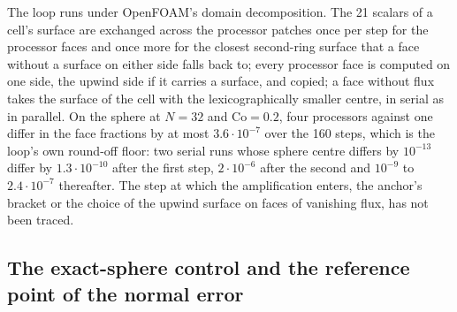 \documentclass[preprint,12pt]{elsarticle}
\begin{document}
The loop runs under OpenFOAM's domain decomposition. The 21 scalars of a cell's surface are exchanged across the processor patches once per step for the processor faces and once more for the closest second-ring surface that a face without a surface on either side falls back to; every processor face is computed on one side, the upwind side if it carries a surface, and copied; a face without flux takes the surface of the cell with the lexicographically smaller centre, in serial as in parallel. On the sphere at $N = 32$ and $\mathrm{Co} = 0.2$, four processors against one differ in the face fractions by at most $3.6\cdot10^{-7}$ over the 160 steps, which is the loop's own round-off floor: two serial runs whose sphere centre differs by $10^{-13}$ differ by $1.3\cdot10^{-10}$ after the first step, $2\cdot10^{-6}$ after the second and $10^{-9}$ to $2.4\cdot10^{-7}$ thereafter. The step at which the amplification enters, the anchor's bracket or the choice of the upwind surface on faces of vanishing flux, has not been traced.

\subsection{The exact-sphere control and the reference point of the normal error}
\label{app:tpf-control}
\end{document}
